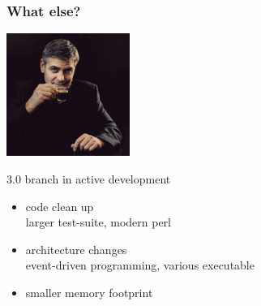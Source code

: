 \begin{frame}
    \frametitle{What else?}

    \begin{center}
    \includegraphics[height=4.0cm]{pics/whatelse.jpg}
    \end{center}

    \pause

    \begin{block}{3.0 branch in active development}
        \begin{itemize}
            \item code clean up\\
            {\small larger test-suite, modern perl}
            \item architecture changes\\
            {\small event-driven programming, various executable}
            \item smaller memory footprint
        \end{itemize}
    \end{block}
\end{frame}


